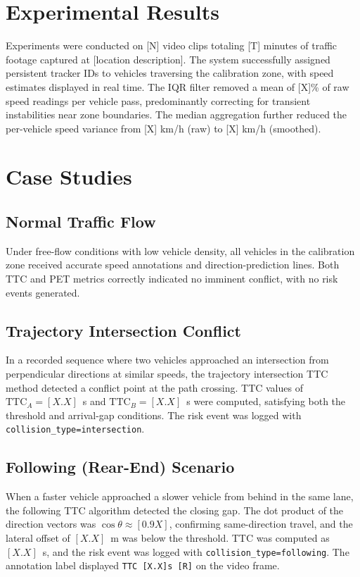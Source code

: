 \documentclass[12pt]{report}
\begin{document}
\section{Experimental Results}

Experiments were conducted on [N] video clips totaling [T] minutes of traffic footage captured at [location description].
The system successfully assigned persistent tracker IDs to vehicles traversing the calibration zone, with speed estimates displayed in real time.
The IQR filter removed a mean of [X]\% of raw speed readings per vehicle pass, predominantly correcting for transient instabilities near zone boundaries.
The median aggregation further reduced the per-vehicle speed variance from [X] km/h (raw) to [X] km/h (smoothed).

\section{Case Studies}

\subsection{Normal Traffic Flow}

Under free-flow conditions with low vehicle density, all vehicles in the calibration zone received accurate speed annotations and direction-prediction lines.
Both TTC and PET metrics correctly indicated no imminent conflict, with no risk events generated.

\subsection{Trajectory Intersection Conflict}

In a recorded sequence where two vehicles approached an intersection from perpendicular directions at similar speeds, the trajectory intersection TTC method detected a conflict point at the path crossing.
TTC values of $\text{TTC}_A = [X.X]$~s and $\text{TTC}_B = [X.X]$~s were computed, satisfying both the threshold and arrival-gap conditions.
The risk event was logged with \texttt{collision\_type=intersection}.

\subsection{Following (Rear-End) Scenario}

When a faster vehicle approached a slower vehicle from behind in the same lane, the following TTC algorithm detected the closing gap.
The dot product of the direction vectors was $\cos\theta \approx [0.9X]$, confirming same-direction travel, and the lateral offset of $[X.X]$~m was below the threshold.
TTC was computed as $[X.X]$~s, and the risk event was logged with \texttt{collision\_type=following}.
The annotation label displayed \texttt{TTC [X.X]s [R]} on the video frame.
\end{document}
